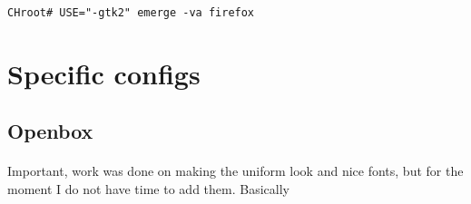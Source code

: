 \documentclass[11pt,a4paper]{article}
\begin{document}
                    \begin{lstlisting}[style=BashInputCHRoot]
 CHroot# USE="-gtk2" emerge -va firefox
                    \end{lstlisting}
    
    \newpage  
    \section{Specific configs}
        
        \subsection{Openbox}
        
            \paragraph{} Important, work was done on making the uniform look and nice fonts, but for the moment I do not have time to add them. Basically
\end{document}
